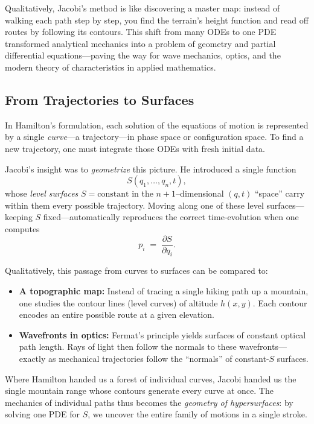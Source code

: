 Qualitatively, Jacobi’s method is like discovering a master map:  
instead of walking each path step by step, you find the terrain’s height function and read off routes by following its contours.  
This shift from many ODEs to one PDE transformed analytical mechanics into a problem of geometry and partial differential equations—paving the way for wave mechanics, optics, and the modern theory of characteristics in applied mathematics.






\subsection{From Trajectories to Surfaces}

In Hamilton’s formulation, each solution of the equations of motion is represented by a single \emph{curve}—a trajectory—in phase space or configuration space.  To find a new trajectory, one must integrate those ODEs with fresh initial data.

Jacobi’s insight was to \emph{geometrize} this picture.  He introduced a single function 
\[
S(q_1,\dots,q_n,t),
\]
whose \emph{level surfaces} \(S=\mathrm{constant}\) in the \(n\!+\!1\)–dimensional \((q,t)\) “space” carry within them every possible trajectory.  Moving along one of these level surfaces—keeping \(S\) fixed—automatically reproduces the correct time‐evolution when one computes
\[
p_i \;=\;\frac{\partial S}{\partial q_i}.
\]

\medskip
Qualitatively, this passage from curves to surfaces can be compared to:

\begin{itemize}
  \item \textbf{A topographic map:}  Instead of tracing a single hiking path up a mountain, one studies the contour lines (level curves) of altitude \(h(x,y)\).  Each contour encodes an entire possible route at a given elevation.
  \item \textbf{Wavefronts in optics:}  Fermat’s principle yields surfaces of constant optical path length.  Rays of light then follow the normals to these wavefronts—exactly as mechanical trajectories follow the “normals” of constant-\(S\) surfaces.
\end{itemize}

Where Hamilton handed us a forest of individual curves, Jacobi handed us the single mountain range whose contours generate every curve at once.  The mechanics of individual paths thus becomes the \emph{geometry of hypersurfaces}: by solving one PDE for \(S\), we uncover the entire family of motions in a single stroke.


